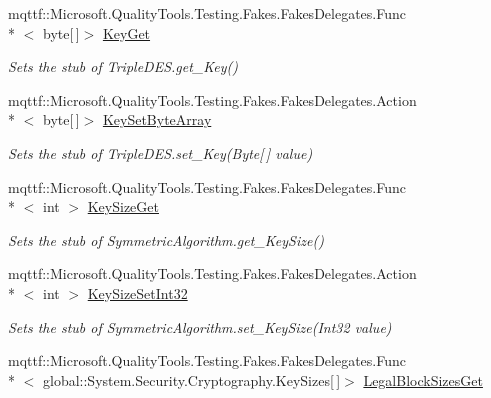 \begin{DoxyCompactItemize}
mqttf\-::\-Microsoft.\-Quality\-Tools.\-Testing.\-Fakes.\-Fakes\-Delegates.\-Func\\*
$<$ byte\mbox{[}$\,$\mbox{]}$>$ \hyperlink{class_system_1_1_security_1_1_cryptography_1_1_fakes_1_1_stub_triple_d_e_s_ab5c81b6496746d06323bef15d67ed64b}{Key\-Get}
\begin{DoxyCompactList}\small\item\em Sets the stub of Triple\-D\-E\-S.\-get\-\_\-\-Key()\end{DoxyCompactList}\item 
mqttf\-::\-Microsoft.\-Quality\-Tools.\-Testing.\-Fakes.\-Fakes\-Delegates.\-Action\\*
$<$ byte\mbox{[}$\,$\mbox{]}$>$ \hyperlink{class_system_1_1_security_1_1_cryptography_1_1_fakes_1_1_stub_triple_d_e_s_a1a2ba1458fef8fcfb635ebb300796860}{Key\-Set\-Byte\-Array}
\begin{DoxyCompactList}\small\item\em Sets the stub of Triple\-D\-E\-S.\-set\-\_\-\-Key(\-Byte\mbox{[}$\,$\mbox{]} value)\end{DoxyCompactList}\item 
mqttf\-::\-Microsoft.\-Quality\-Tools.\-Testing.\-Fakes.\-Fakes\-Delegates.\-Func\\*
$<$ int $>$ \hyperlink{class_system_1_1_security_1_1_cryptography_1_1_fakes_1_1_stub_triple_d_e_s_ab2a139be4e5a788bc3b48a5b224fed9f}{Key\-Size\-Get}
\begin{DoxyCompactList}\small\item\em Sets the stub of Symmetric\-Algorithm.\-get\-\_\-\-Key\-Size()\end{DoxyCompactList}\item 
mqttf\-::\-Microsoft.\-Quality\-Tools.\-Testing.\-Fakes.\-Fakes\-Delegates.\-Action\\*
$<$ int $>$ \hyperlink{class_system_1_1_security_1_1_cryptography_1_1_fakes_1_1_stub_triple_d_e_s_abc3045f39477465c639b9be90ca4f118}{Key\-Size\-Set\-Int32}
\begin{DoxyCompactList}\small\item\em Sets the stub of Symmetric\-Algorithm.\-set\-\_\-\-Key\-Size(\-Int32 value)\end{DoxyCompactList}\item 
mqttf\-::\-Microsoft.\-Quality\-Tools.\-Testing.\-Fakes.\-Fakes\-Delegates.\-Func\\*
$<$ global\-::\-System.\-Security.\-Cryptography.\-Key\-Sizes\mbox{[}$\,$\mbox{]}$>$ \hyperlink{class_system_1_1_security_1_1_cryptography_1_1_fakes_1_1_stub_triple_d_e_s_a9d0e4e01fe949f79ac648f392d291db1}{Legal\-Block\-Sizes\-Get}

\end{DoxyCompactItemize}
